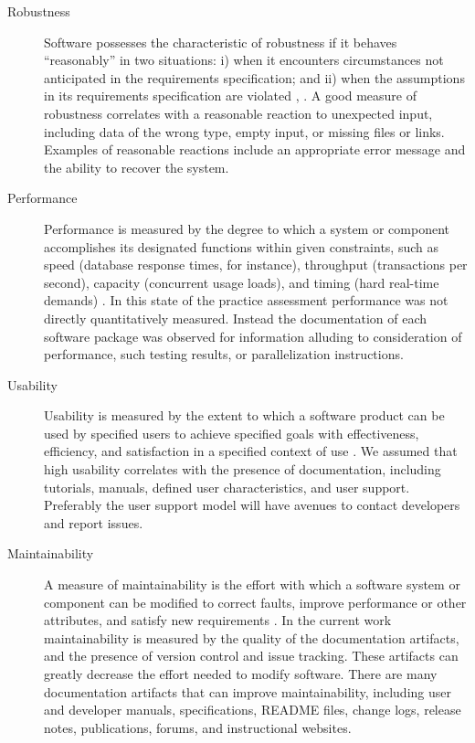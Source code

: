 \documentclass[final, 3p, times, authoryear]{elsarticle}
\begin{document}
\begin{description}
	\item[Robustness] Software possesses the characteristic of robustness if it
	behaves ``reasonably'' in two situations: i) when it encounters
	circumstances not anticipated in the requirements specification; and ii)
	when the assumptions in its requirements specification are violated
	\citep{boehm2007software}, \citep[p.\ 19]{GhezziEtAl2003}. A good measure of
	robustness correlates with a reasonable reaction to unexpected input,
	including data of the wrong type, empty input, or missing files or links.
	Examples of reasonable reactions include an appropriate error message and the
	ability to recover the system.
	
	\item[Performance] Performance is measured by the degree to which a system
	or component accomplishes its designated functions within given constraints,
	such as speed (database response times, for instance), throughput
	(transactions per second), capacity (concurrent usage loads), and timing
	(hard real-time demands) \citep{IEEEStdGlossarySET1990, wiegers2003softreq}.
	In this state of the practice assessment performance was not directly
	quantitatively measured. Instead the documentation of each software package
	was observed for information alluding to consideration of performance, such
	testing results, or parallelization instructions. 
	
	\item[Usability] Usability is measured by the extent to which a software
	product can be used by specified users to achieve specified goals with
	effectiveness, efficiency, and satisfaction in a specified context of use
	\citep{nielsonusability}. We assumed that high usability correlates with
	the presence of documentation, including tutorials, manuals, defined
	user characteristics, and user support. Preferably the user support model
	will have avenues to contact developers and report issues.
	
	\item[Maintainability] A measure of maintainability is the effort with which
	a software system or component can be modified to correct faults, improve
	performance or other attributes, and satisfy new requirements
	\citep{IEEEStdGlossarySET1990, boehm2007software}. In the current work
	maintainability is measured by the quality of the documentation artifacts,
	and the presence of version control and issue tracking. These artifacts can
	greatly decrease the effort needed to modify software. There are many
	documentation artifacts that can improve maintainability, including user and
	developer manuals, specifications, README files, change logs, release notes,
	publications, forums, and instructional websites. 


\end{description}
\end{document}
